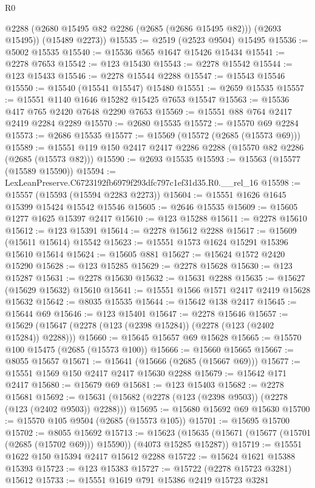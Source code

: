 \begin{lexlean}{R0}
\begin{coremodule}
        @2288
        (@2680 @15495 @82 @2286 (@2685 (@2686 @15495 @82)))
        (@2693 @15495))
      (@15489 @2273))
@15535 := @2519 (@2523 @9504) @15495
@15536 := @5002 @15535
@15540 := @15536 @565 @1647 @15426 @15434
@15541 := @2278 @7653
@15542 := @123 @15430
@15543 := @2278 @15542
@15544 := @123 @15433
@15546 := @2278 @15544 @2288
@15547 := @15543 @15546
@15550 := @15540 (@15541 @15547) @15480
@15551 := @2659 @15535
@15557 := @15551 @1140 @1646 @15282 @15425 @7653 @15547
@15563 := @15536 @417 @765 @2420 @7648 @2290 @7653
@15569 := @15551 @88 @764 @2417 @2419 @2284 @2289
@15570 := @2680 @15535
@15572 := @15570 @69 @2284
@15573 := @2686 @15535
@15577 := @15569 (@15572 (@2685 (@15573 @69)))
@15589 := @15551 @119 @150 @2417 @2417 @2286 @2288 (@15570 @82 @2286 (@2685 (@15573 @82)))
@15590 := @2693 @15535
@15593 := @15563 (@15577 (@15589 @15590))
@15594 := LexLeanPreserve.C6723192fb6979f293dfc797c1ef31d35.R0.__rel_16
@15598 := @15557 (@15593 (@15594 @2283 @2273))
@15604 := @15551 @1626 @1645 @15399 @15424 @15542 @15546
@15605 := @2646 @15535
@15609 := @15605 @1277 @1625 @15397 @2417
@15610 := @123 @15288
@15611 := @2278 @15610
@15612 := @123 @15391
@15614 := @2278 @15612 @2288
@15617 := @15609 (@15611 @15614) @15542
@15623 := @15551 @1573 @1624 @15291 @15396 @15610 @15614
@15624 := @15605 @881
@15627 := @15624 @1572 @2420 @15290
@15628 := @123 @15285
@15629 := @2278 @15628
@15630 := @123 @15287
@15631 := @2278 @15630
@15632 := @15631 @2288
@15635 := @15627 (@15629 @15632) @15610
@15641 := @15551 @1566 @1571 @2417 @2419 @15628 @15632
@15642 := @8035 @15535
@15644 := @15642 @138 @2417
@15645 := @15644 @69
@15646 := @123 @15401
@15647 := @2278 @15646
@15657 := @15629 (@15647 (@2278 (@123 (@2398 @15284)) (@2278 (@123 (@2402 @15284)) @2288)))
@15660 := @15645 @15657 @69 @15628
@15665 := @15570 @100 @15475 (@2685 (@15573 @100))
@15666 := @15660 @15665
@15667 := @8055 @15657
@15671 := @15641 (@15666 (@2685 (@15667 @69)))
@15677 := @15551 @1569 @150 @2417 @2417 @15630 @2288
@15679 := @15642 @171 @2417
@15680 := @15679 @69
@15681 := @123 @15403
@15682 := @2278 @15681
@15692 := @15631 (@15682 (@2278 (@123 (@2398 @9503)) (@2278 (@123 (@2402 @9503)) @2288)))
@15695 := @15680 @15692 @69 @15630
@15700 := @15570 @105 @9504 (@2685 (@15573 @105))
@15701 := @15695 @15700
@15702 := @8055 @15692
@15713 := @15623
    (@15635 (@15671 (@15677 (@15701 (@2685 (@15702 @69))) @15590)) (@4073 @15285 @15287))
@15719 := @15551 @1622 @150 @15394 @2417 @15612 @2288
@15722 := @15624 @1621 @15388 @15393
@15723 := @123 @15383
@15727 := @15722 (@2278 @15723 @3281) @15612
@15733 := @15551 @1619 @791 @15386 @2419 @15723 @3281

\end{coremodule}
\end{lexlean}
